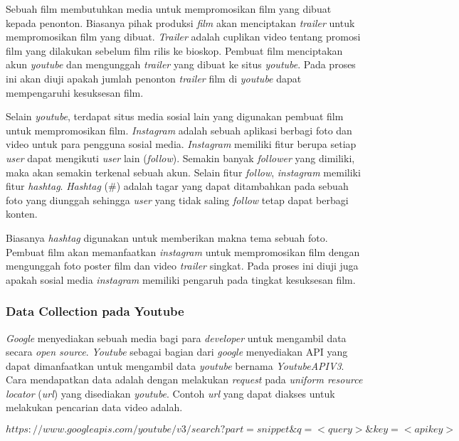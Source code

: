 Sebuah film membutuhkan media untuk mempromosikan film yang dibuat kepada penonton.  Biasanya pihak produksi \textit{film} akan menciptakan \textit{trailer} untuk mempromosikan film yang dibuat. \textit{Trailer} adalah cuplikan video tentang promosi film yang dilakukan sebelum film rilis ke bioskop. Pembuat film menciptakan akun \textit{youtube} dan mengunggah \textit{trailer} yang dibuat ke situs \textit{youtube}. Pada proses ini akan diuji apakah jumlah penonton \textit{trailer} film di \textit{youtube} dapat mempengaruhi kesuksesan film.

Selain \textit{youtube}, terdapat situs media sosial lain yang digunakan pembuat film untuk mempromosikan film. \textit{Instagram} adalah sebuah aplikasi berbagi foto dan video untuk para pengguna sosial media. \textit{Instagram} memiliki fitur berupa setiap \textit{user} dapat mengikuti \textit{user} lain (\textit{follow}). Semakin banyak \textit{follower} yang dimiliki, maka akan semakin terkenal sebuah akun. Selain fitur \textit{follow}, \textit{instagram} memiliki fitur \textit{hashtag}. \textit{Hashtag} (\#) adalah tagar yang dapat ditambahkan pada sebuah foto yang diunggah sehingga \textit{user} yang tidak saling \textit{follow} tetap dapat berbagi konten. 

Biasanya \textit{hashtag} digunakan untuk memberikan makna tema sebuah foto. Pembuat film akan memanfaatkan \textit{instagram} untuk mempromosikan film dengan mengunggah foto poster film dan video \textit{trailer} singkat. Pada proses ini diuji juga apakah sosial media \textit{instagram} memiliki pengaruh pada tingkat kesuksesan film. 


\subsubsection{Data Collection pada Youtube}
\textit{Google} menyediakan sebuah media bagi para \textit{developer} untuk mengambil data secara  \textit{open source}. \textit{Youtube} sebagai bagian dari \textit{google} menyediakan API yang dapat dimanfaatkan untuk mengambil data \textit{youtube} bernama \textit{YoutubeAPIV3}. Cara mendapatkan data adalah dengan melakukan \textit{request} pada \textit{uniform resource locator} (\textit{url}) yang disediakan \textit{youtube}. Contoh \textit{url} yang dapat diakses untuk melakukan pencarian data video adalah. 


\begin{displaymath}
https://www.googleapis.com/youtube/v3/search?part=snippet\& q=<query>\& key=<apikey>
\end{displaymath}

